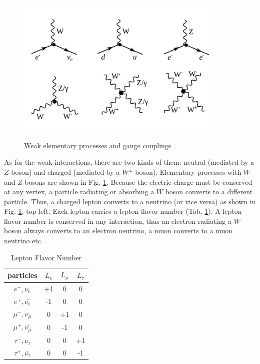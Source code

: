 \begin{figure}[htb]
  \begin{center}
    {\includegraphics[width=0.90\textwidth]{../figs/Intro/feynmW.png}}
    \caption{Weak elementary processes and gauge couplings}
    \label{fig:feynmW}
  \end{center}
\end{figure}


As for the weak interactions, there are two kinds of them: neutral (mediated by a $Z$ boson) and charged (mediated by a $W^\pm$ boson). Elementary processes with $W$ and $Z$ bosons are shown in Fig. \ref{fig:feynmW}. Because the electric charge must be conserved at any vertex, a particle radiating or absorbing a $W$ boson converts to a different particle. Thus, a charged lepton converts to a neutrino (or vice versa) as shown in Fig. \ref{fig:feynmW}, top left. Each lepton carries a lepton flavor number (Tab. \ref{tab:LeptonFlavorNumber}). A lepton flavor number is conserved in any interaction, thus an electron radiating a $W$ boson  always converts to an electron neutrino, a muon converts to a muon neutrino etc.\\

 \begin{table}[h]
  \begin{center}
  \caption{ Lepton Flavor Number}
  \vspace{5 mm}
  \begin{tabular}{|c|c|c|c|}
     \hline
     particles & $L_e$ & $L_{\mu}$ & $L_{\tau}$ \\ \hline
     $e^-,\nu_e$ &  +1  &  0  &  0  \\ \hline 
     $e^+, \bar{\nu_e}$ &  -1  &  0  &  0  \\ \hline 
     $\mu^-,\nu_{\mu}$ &  0  &  +1  &  0  \\ \hline 
     $\mu^+, \bar{\nu_{\mu}}$ &  0  &  -1  &  0  \\ \hline 
     $\tau^-,\nu_{\tau}$ &  0  &  0  &  +1  \\ \hline 
     $\tau^+, \bar{\nu_{\tau}}$ &  0  &  0  &  -1  \\ \hline 
  \end{tabular}
  \label{tab:LeptonFlavorNumber}
  \end{center}
 \end{table}

